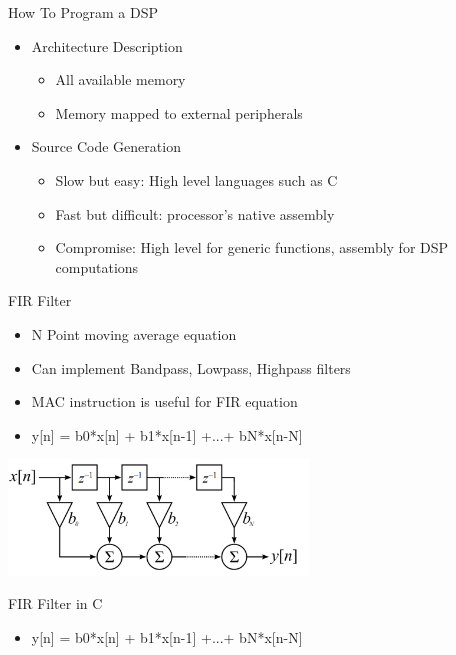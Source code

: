\documentclass{beamer}
\begin{document}
\begin{frame}{How To Program a DSP}
    \begin{itemize}
        \item Architecture Description
            \begin{itemize}
                \item All available memory
                \item Memory mapped to external peripherals
            \end{itemize}
        \item Source Code Generation
            \begin{itemize}
                \item Slow but easy: High level languages such as C
                \item Fast but difficult: processor's native assembly
                \item Compromise: High level for generic functions, assembly for DSP computations
            \end{itemize}
    \end{itemize}
\end{frame}

\begin{frame}{FIR Filter}
    \begin{itemize}
        \item N Point moving average equation
        \item Can implement Bandpass, Lowpass, Highpass filters
        \item MAC instruction is useful for FIR equation
        \item y[n] = b0*x[n] + b1*x[n-1] +...+ bN*x[n-N]
    \end{itemize}

    \begin{center}
        \includegraphics[width=0.6\textwidth]{fir.png}
    \end{center}
\end{frame}

\begin{frame}{FIR Filter in C}
    \begin{itemize}
        \item y[n] = b0*x[n] + b1*x[n-1] +...+ bN*x[n-N]
    \end{itemize}
    \begin{center}
        {\tiny
            
        }
    \end{center}
\end{frame}
\end{document}
